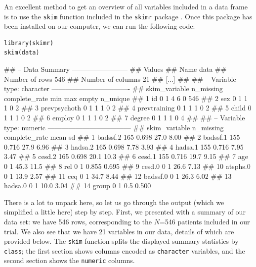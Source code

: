 An excellent method to get an overview of all variables included in a data frame is to use the \texttt{skim} function included in the \texttt{skimr} package \citep{skimr}. Once this package has been installed on our computer, we can run the following code:

\begin{lstlisting}
library(skimr)
skim(data)
\end{lstlisting}

\begin{example}
## -- Data Summary ------------------------
## Values
## Name                       data  
## Number of rows             546   
## Number of columns          21    
## [...]  
## 
## -- Variable type: character ----------------------------------
##   skim_variable n_missing complete_rate min max empty n_unique
## 1 id                    0             1   4   6     0      546
## 2 sex                   0             1   1   1     0        2
## 3 prevpsychoth          0             1   1   1     0        2
## 4 prevtraining          0             1   1   1     0        2
## 5 child                 0             1   1   1     0        2
## 6 employ                0             1   1   1     0        2
## 7 degree                0             1   1   1     0        4
## 
## -- Variable type: numeric ------------------------------------
##    skim_variable n_missing complete_rate  mean     sd
## 1  badssf.2            165         0.698 27.0   8.00
## 2  badssf.1            155         0.716 27.9   6.96
## 3  hadsa.2             165         0.698  7.78  3.93
## 4  hadsa.1             155         0.716  7.95  3.47
## 5  cesd.2              165         0.698 20.1  10.3 
## 6  cesd.1              155         0.716 19.7   9.15
## 7  age                   0         1     45.3  11.5
## 8  rel                   0         1      0.855  0.695
## 9  cesd.0                0         1     26.6   7.13
## 10 atsphs.0              0         1     13.9   2.57
## 11 ceq                   0         1     34.7   8.44
## 12 badssf.0              0         1     26.3   6.02
## 13 hadsa.0               0         1     10.0   3.04
## 14 group                 0         1      0.5   0.500 
\end{example}

There is a lot to unpack here, so let us go through the output (which we simplified a little here) step by step. First, we presented with a summary of our data set: we have 546 rows, corresponding to the $N$=546 patients included in our trial. We also see that we have 21 variables in our data, details of which are provided below. The \texttt{skim} function splits the displayed summary statistics by \texttt{class}; the first section shows columns encoded as \texttt{character} variables, and the second section shows the \texttt{numeric} columns. 

